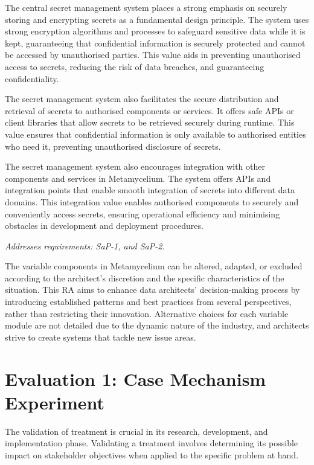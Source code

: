 \documentclass[journal]{IEEEtran}
\begin{document}
\begin{enumerate}
    The central secret management system places a strong emphasis on securely storing and encrypting secrets as a fundamental design principle. The system uses strong encryption algorithms and processes to safeguard sensitive data while it is kept, guaranteeing that confidential information is securely protected and cannot be accessed by unauthorised parties. This value aids in preventing unauthorised access to secrets, reducing the risk of data breaches, and guaranteeing confidentiality.
    
    The secret management system also facilitates the secure distribution and retrieval of secrets to authorised components or services. It offers safe APIs or client libraries that allow secrets to be retrieved securely during runtime. This value ensures that confidential information is only available to authorised entities who need it, preventing unauthorised disclosure of secrets.
    
    The secret management system also encourages integration with other components and services in Metamycelium. The system offers APIs and integration points that enable smooth integration of secrets into different data domains. This integration value enables authorised components to securely and conveniently access secrets, ensuring operational efficiency and minimising obstacles in development and deployment procedures.
    
    \textit{Addresses requirements: SaP-1, and SaP-2.} 

\end{enumerate}

The variable components in Metamycelium can be altered, adapted, or excluded according to the architect's discretion and the specific characteristics of the situation. This RA aims to enhance data architects' decision-making process by introducing established patterns and best practices from several perspectives, rather than restricting their innovation. Alternative choices for each variable module are not detailed due to the dynamic nature of the industry, and architects strive to create systems that tackle new issue areas. 

\section{Evaluation 1: Case Mechanism Experiment}
\label{sec:discussion}

The validation of treatment is crucial in its research, development, and implementation phase. Validating a treatment involves determining its possible impact on stakeholder objectives when applied to the specific problem at hand. 
\end{document}
